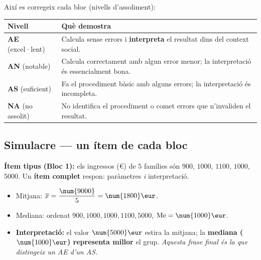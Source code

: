 \noindent Així es corregeix cada bloc (nivells d'assoliment):
\begin{center}
\renewcommand{\arraystretch}{1.3}
\begin{tabular}{p{2.4cm} p{10.2cm}}
\toprule
\textbf{Nivell} & \textbf{Què demostra} \\
\midrule
\textbf{AE} (excel·lent) & Calcula sense errors i \textbf{interpreta} el resultat dins
del context social. \\
\textbf{AN} (notable) & Calcula correctament amb algun error menor; la interpretació és
essencialment bona. \\
\textbf{AS} (suficient) & Fa el procediment bàsic amb alguns errors; la interpretació
és incompleta. \\
\textbf{NA} (no assolit) & No identifica el procediment o comet errors que
n'invaliden el resultat. \\
\bottomrule
\end{tabular}
\end{center}

\subsection{Simulacre — un ítem de cada bloc}

\begin{exemple}
\textbf{Ítem tipus (Bloc 1):} els ingressos (€) de $5$ famílies són $\num{900}$,
$\num{1000}$, $\num{1100}$, $\num{1000}$, $\num{5000}$. Un \textbf{ítem complet}
respon: paràmetres \emph{i} interpretació.
\begin{itemize}[leftmargin=1.4em, itemsep=1pt]
  \item Mitjana: $\overline{x}=\dfrac{\num{9000}}{5}=\num{1800}\eur$.
  \item Mediana: ordenat $\num{900},\num{1000},\underline{\num{1000}},\num{1100},\num{5000}$,
        $\text{Me}=\num{1000}\eur$.
  \item \textbf{Interpretació:} el valor $\num{5000}\eur$ estira la mitjana; la
        \textbf{mediana ($\num{1000}\eur$) representa millor} el grup. \emph{Aquesta
        frase final és la que distingeix un AE d'un AS.}
\end{itemize}
\end{exemple}

